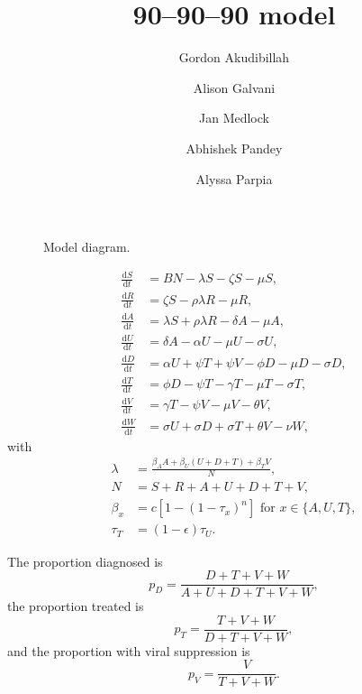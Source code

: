 \documentclass{article}
\title{90--90--90 model}
\author{
  Gordon Akudibillah
  \and
  Alison Galvani
  \and
  Jan Medlock
  \and
  Abhishek Pandey
  \and
  Alyssa Parpia}
\newcommand{\md}{\mathrm{d}}
\begin{document}
\maketitle


\begin{figure}
  \centering
  
  \caption{Model diagram.}
\end{figure}


\begin{equation}
  \label{model_eqns}
  \begin{split}
    \frac{\md S}{\md t} &= B N - \lambda S - \zeta S- \mu S,
    \\
     \frac{\md R}{\md t} & = \zeta S - \rho \lambda R - \mu R,
    \\
    \frac{\md A}{\md t} &= \lambda S +\rho \lambda R - \delta A - \mu A,
    \\
    \frac{\md U}{\md t} &= \delta A - \alpha U - \mu U - \sigma U,
    \\
    \frac{\md D}{\md t} &=  \alpha U + \psi T + \psi V
    - \phi D - \mu D - \sigma D,
    \\
    \frac{\md T}{\md t} &= \phi D - \psi T - \gamma T - \mu T
    - \sigma T,
    \\
    \frac{\md V}{\md t} &= \gamma T - \psi V - \mu V - \theta V,
    \\
    \frac{\md W}{\md t} &= \sigma U + \sigma D + \sigma T + \theta V -
    \nu W,
  \end{split}
\end{equation}
with
\begin{equation}
  \label{force_of_infection}
  \begin{split}
    \lambda &= \frac{\beta_A A + \beta_U (U + D + T) + \beta_T V}{N},
    \\
    N &= S + R +  A + U + D + T + V,
    \\
    \beta_x &= c \left[1 - (1 - \tau_x)^n\right]
    \text{ for $x \in \{A, U, T\}$},
    \\
    \tau_T &= (1 - \epsilon) \tau_U.
  \end{split}
\end{equation}

The proportion diagnosed is
\begin{equation}
  p_D = \frac{D + T + V + W}{A + U + D + T + V + W},
\end{equation}
the proportion treated is
\begin{equation}
  p_T = \frac{T + V + W}{D + T + V + W},
\end{equation}
and the proportion with viral suppression is
\begin{equation}
  p_V = \frac{V}{T + V + W}.
\end{equation}
\end{document}
